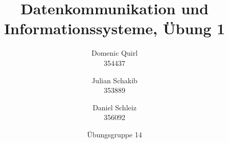 \documentclass{../exercisesheet}
\title{Datenkommunikation und Informationssysteme, Übung 1}
\author{
    Domenic Quirl \\ 354437
    \and
    Julian Schakib \\ 353889
    \and 
    Daniel Schleiz \\ 356092
}
\date{Übungsgruppe 14}
\begin{document}
\maketitle
\pointtable

\begin{exercise}{1}
\end{exercise}

\begin{exercise}{3}
	\begin{subexercise}
		
	\end{subexercise}

	\begin{subexercise}
		  
	\end{subexercise}
\end{exercise}


\begin{exercise}{5}
	\begin{subexercise}
	
	\end{subexercise}

	\begin{subexercise}
	
	\end{subexercise}

	\begin{subexercise} 
	
	\end{subexercise}
\end{exercise}

\begin{exercise}{1.5}
	\begin{subexercise}
	
	\end{subexercise}

	\begin{subexercise}
	
	\end{subexercise}

	\begin{subexercise} 
	
	\end{subexercise}
\end{exercise}
\end{document}
